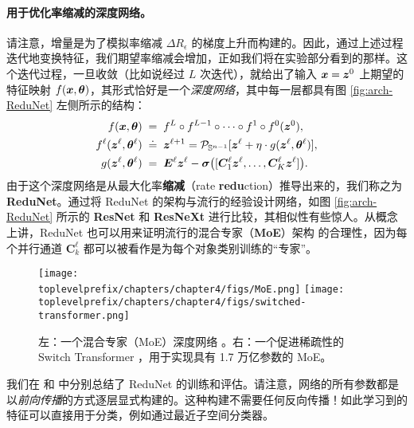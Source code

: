 \documentclass[../../book-main_zh.tex]{subfiles}
\begin{document}
\paragraph{用于优化率缩减的深度网络。} 请注意，增量是为了模拟率缩减 $\Delta R_\epsilon$ 的梯度上升而构建的。因此，通过上述过程迭代地变换特征，我们期望率缩减会增加，正如我们将在实验部分看到的那样。这个迭代过程，一旦收敛（比如说经过 $L$ 次迭代），就给出了输入 $\bm{x} = \bm{z}^0$ 上期望的特征映射 $f(\bm{x}, \bm \theta)$，其形式恰好是一个{\em 深度网络}，其中每一层都具有图 \ref{fig:arch-ReduNet} 左侧所示的结构：
\begin{equation}\label{eqn:ReduNet}
\begin{aligned}
f(\bm{x}, \bm \theta)\; =&  \;\;f^L \circ f^{L-1} \circ  \cdots \circ f^1 \circ
    f^0(\bm{z}^0),  \\
f^\ell(\bm{z}^\ell, \bm \theta^\ell) \; \doteq & \;\; \bm{z}^{\ell+1} = \mathcal{P}_{\mathbb{S}^{n-1}}[\bm{z}^{\ell} + \eta\cdot g(\bm{z}^{\ell}, \bm \theta^{\ell})], \\
g(\bm{z}^{\ell}, \bm \theta^{\ell}) \; =&\;\; \bm E^{\ell} \bm{z}^{\ell} -  \bm \sigma\big([\bm{C}^{\ell}_{1} \bm{z}^{\ell}, \dots, \bm{C}^{\ell}_{K} \bm{z}^{\ell}]\big).
\end{aligned}
\end{equation}
由于这个深度网络是从最大化率\textbf{缩减}（rate \textbf{redu}ction）推导出来的，我们称之为 \textbf{ReduNet}。通过将 ReduNet 的架构与流行的经验设计网络，如图 \ref{fig:arch-ReduNet} 所示的 \textbf{ResNet} 和 \textbf{ResNeXt} 进行比较，其相似性有些惊人。从概念上讲，ReduNet 也可以用来证明流行的混合专家（\textbf{MoE}）架构 \cite{MoE} 的合理性，因为每个并行通道 $\bm{C}^{\ell}_k$ 都可以被看作是为每个对象类别训练的“专家”。

\begin{figure}[t]
    \centering
    \texttt{[image: \\toplevelprefix/chapters/chapter4/figs/MoE.png]} \hspace{5mm}
    \texttt{[image: \\toplevelprefix/chapters/chapter4/figs/switched-transformer.png]}
    \caption{左：一个混合专家（MoE）深度网络 \cite{MoE}。右：一个促进稀疏性的 Switch Transformer \cite{Fedus-2022}，用于实现具有 1.7 万亿参数的 MoE。}
    \label{fig:enter-label}
\end{figure}

我们在  和  中分别总结了 ReduNet 的训练和评估。请注意，网络的所有参数都是以{\em 前向传播}的方式逐层显式构建的。这种构建不需要任何反向传播！如此学习到的特征可以直接用于分类，例如通过最近子空间分类器。
\end{document}
